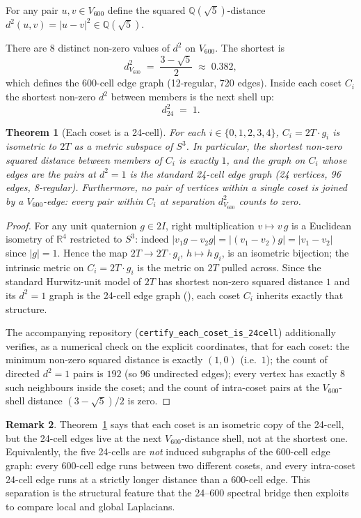 \documentclass[11pt]{article}
\newcommand{\Vsix}{V_{600}}
\newcommand{\twoI}{2I}
\newcommand{\twoT}{2T}
\theoremstyle{plain}
\newtheorem{theorem}{Theorem}
\theoremstyle{definition}
\newtheorem{remark}[theorem]{Remark}
\begin{document}
For any pair $u, v\in\Vsix$ define the squared
$\mathbb{Q}(\sqrt 5)$-distance
$d^2(u, v) = |u - v|^2 \in \mathbb{Q}(\sqrt 5)$.

There are 8 distinct non-zero values of $d^2$ on $\Vsix$.  The
shortest is
\[
  d^2_{V_{600}} \;=\; \frac{3 - \sqrt 5}{2} \;\approx\; 0.382,
\]
which defines the 600-cell edge graph (12-regular, 720 edges).
Inside each coset $C_i$ the shortest non-zero $d^2$ between members
is the next shell up:
\[
  d^2_{24} \;=\; 1.
\]

\begin{theorem}[Each coset is a 24-cell]\label{thm:24cell-on-coset}
For each $i\in\{0,1,2,3,4\}$, $C_i = \twoT\cdot g_i$ is isometric to
$\twoT$ as a metric subspace of $S^3$.  In particular, the shortest
non-zero squared distance between members of $C_i$ is exactly $1$,
and the graph on $C_i$ whose edges are the pairs at $d^2 = 1$ is the
standard 24-cell edge graph (24 vertices, 96 edges, 8-regular).
Furthermore, no pair of vertices within a single coset is joined by
a $\Vsix$-edge: every pair within $C_i$ at separation
$d^2_{V_{600}}$ counts to zero.
\end{theorem}

\begin{proof}
For any unit quaternion $g\in\twoI$, right multiplication
$v\mapsto v\,g$ is a Euclidean isometry of $\mathbb{R}^4$
restricted to $S^3$: indeed $|v_1 g - v_2 g| = |(v_1 - v_2)g|
= |v_1 - v_2|$ since $|g| = 1$.  Hence the map $\twoT \to
\twoT\!\cdot\! g_i$, $h\mapsto h\,g_i$, is an isometric bijection;
the intrinsic metric on $C_i = \twoT\!\cdot\! g_i$ is the metric on
$\twoT$ pulled across.  Since the standard Hurwitz-unit model of
$\twoT$ has shortest non-zero squared distance $1$ and its $d^2{=}1$
graph is the 24-cell edge graph
(\cite{Coxeter1973,ConwaySloane1999}), each coset $C_i$ inherits
exactly that structure.

The accompanying repository (\texttt{certify\_each\_coset\_is\_24cell})
additionally verifies, as a numerical check on the explicit
coordinates, that for each coset: the minimum non-zero squared
distance is exactly $(1, 0)$ (i.e.\ $1$); the count of directed
$d^2{=}1$ pairs is $192$ (so $96$ undirected edges); every vertex
has exactly $8$ such neighbours inside the coset; and the count of
intra-coset pairs at the $\Vsix$-shell distance $(3-\sqrt 5)/2$ is
zero.
\end{proof}

\begin{remark}\label{rmk:not-induced}
Theorem~\ref{thm:24cell-on-coset} says that each coset is an
isometric copy of the 24-cell, but the 24-cell edges live at the
next $\Vsix$-distance shell, not at the shortest one.  Equivalently,
the five 24-cells are \emph{not} induced subgraphs of the 600-cell
edge graph: every 600-cell edge runs between two different cosets,
and every intra-coset 24-cell edge runs at a strictly longer
distance than a 600-cell edge.  This separation is the structural
feature that the 24--600 spectral bridge then exploits to compare
local and global Laplacians.
\end{remark}
\end{document}
